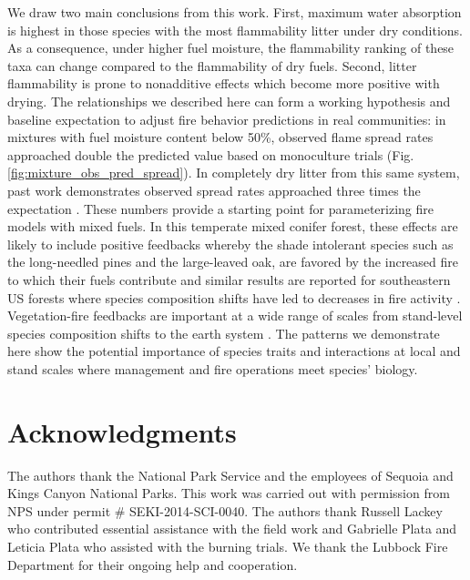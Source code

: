 \documentclass[letterpaper,12pt]{article}
\begin{document}

We draw two main conclusions from this work. First, maximum water absorption is
highest in those species with the most flammability litter under dry conditions.
As a consequence, under higher fuel moisture, the flammability ranking of
these taxa can change compared to the flammability of dry fuels. Second, litter
flammability is prone to nonadditive effects which become more positive with
drying. The relationships we described here can form a working hypothesis and
baseline expectation to adjust fire behavior predictions in real communities:
in mixtures with fuel moisture content below 50\%, observed flame spread rates
approached double the predicted value based on monoculture trials (Fig.
\ref{fig:mixture_obs_pred_spread}). In completely dry litter from this same
system, past work demonstrates observed spread rates approached three times the
expectation \citep{Magalhaes+Schwilk-2012}. These numbers provide a starting
point for parameterizing fire models with mixed fuels. In this temperate mixed
conifer forest, these effects are likely to include positive feedbacks whereby
the shade intolerant species such as the long-needled pines and the
large-leaved oak, are favored by the increased fire to which their fuels
contribute \citep{Schwilk+Caprio-2011} and similar results are reported for
southeastern US forests where species composition shifts have led to decreases
in fire activity \citep{Nowacki+Abrams-2008}. Vegetation-fire feedbacks are
important at a wide range of scales from stand-level species composition shifts
to the earth system \citep{Harris+Remenyi+etal-2016,
  Archibald+Lehmann+etal-2018}. The patterns we demonstrate here show the
potential importance of species traits and interactions at local and stand
scales where management and fire operations meet species' biology.



\section*{Acknowledgments}

The authors thank the National Park Service and the employees of Sequoia and
Kings Canyon National Parks. This work was carried out with permission from NPS
under permit \# SEKI-2014-SCI-0040. The authors thank Russell Lackey who
contributed essential assistance with the field work and Gabrielle Plata and
Leticia Plata who assisted with the burning trials. We thank the Lubbock Fire
Department for their ongoing help and cooperation.
\end{document}
